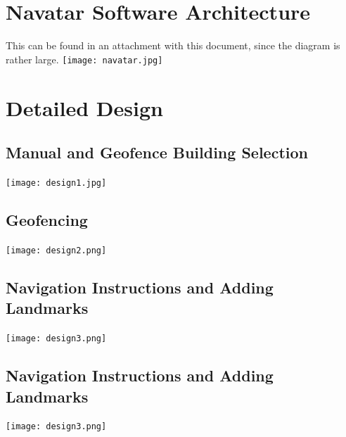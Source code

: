 \documentclass{scrreprt}
\begin{document}
	\section{Navatar Software Architecture}
		This can be found in an attachment with this document, since the diagram is rather large.
		\texttt{[image: navatar.jpg]}
	\pagebreak
	\section{Detailed Design}
		\subsection{Manual and Geofence Building Selection}
			\texttt{[image: design1.jpg]}
		\pagebreak	
		\subsection{Geofencing}
			\texttt{[image: design2.png]}
		\subsection{Navigation Instructions and Adding Landmarks}
			\texttt{[image: design3.png]}
		\subsection{Navigation Instructions and Adding Landmarks}
			\texttt{[image: design3.png]}
\end{document}
